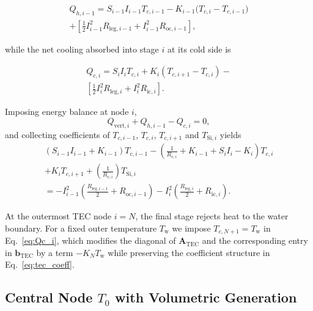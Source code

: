 \documentclass[conference]{IEEEtran}
\begin{document}
\begin{multline}
	Q_{h,i-1} = S_{i-1} I_{i-1} T_{c,i-1} - K_{i-1}\bigl(T_{c,i} - T_{c,i-1}\bigr)\\
	+ \left[ \tfrac{1}{2} I_{i-1}^2 R_{\text{leg},i-1} + I_{i-1}^2 R_{\text{oc},i-1} \right],	
	\label{eq:Qh_i_minus1}
\end{multline}

while the net cooling absorbed into stage $i$ at its cold side is

\begin{multline}
	Q_{c,i} = S_i I_i T_{c,i} + K_i (T_{c,i+1} - T_{c,i}) - \\ \left[ \frac{1}{2} I_i^2 R_{\text{leg},i} 
	+ I_i^2 R_{\text{ic},i} \right].
	\label{eq:Qc_i}
\end{multline}

Imposing energy balance at node $i$,
\begin{equation}
	Q_{\text{vert},i} + Q_{h,i-1} - Q_{c,i} = 0,
	\label{eq:tec_balance}
\end{equation}
and collecting coefficients of $T_{c,i-1}$, $T_{c,i}$, $T_{c,i+1}$ and $T_{\text{Si},i}$ yields
\begin{multline}
	\left( S_{i-1} I_{i-1} + K_{i-1} \right) T_{c,i-1}
	- \left( \frac{1}{R_{v,i}} + K_{i-1} + S_i I_i - K_i \right) T_{c,i} \\
	+ K_i T_{c,i+1}
	+ \left( \frac{1}{R_{v,i}} \right) T_{\text{Si},i} \\
	= - I_{i-1}^2 \left( \frac{R_{\text{leg},i-1}}{2} + R_{\text{oc},i-1} \right) - I_i^2 \left( \frac{R_{\text{leg},i}}{2} + R_{\text{ic},i} \right).
	\label{eq:tec_coeff}
\end{multline}

At the outermost TEC node $i=N$, the final stage rejects heat to the water boundary. For a fixed outer temperature $T_{\text{w}}$ we impose $T_{c,N+1} = T_{\text{w}}$ in Eq.~\eqref{eq:Qc_i}, which modifies the diagonal of $\mathbf{A}_{\text{TEC}}$ and the corresponding entry in $\mathbf{b}_{\text{TEC}}$ by a term $-K_N T_{\text{w}}$ while preserving the coefficient structure in Eq.~\eqref{eq:tec_coeff}.

\subsection{Central Node $T_0$ with Volumetric Generation}
\end{document}
